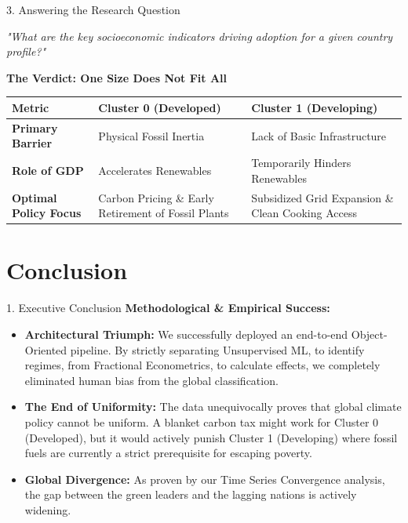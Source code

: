 \documentclass[aspectratio=169]{beamer}
\begin{document}
\begin{frame}{3. Answering the Research Question}
  \begin{center}
      \Large \textit{"What are the key socioeconomic indicators driving adoption for a given country profile?"}
  \end{center}
  \vspace{0.6cm}
  
  \textbf{The Verdict: One Size Does Not Fit All}
  \begin{table}[]
      \centering
      \small
      \begin{tabular}{p{4cm} p{5cm} p{5cm}}
      \toprule
      \textbf{Metric} & \textbf{Cluster 0 (Developed)} & \textbf{Cluster 1 (Developing)} \\
      \midrule
      \textbf{Primary Barrier} & Physical Fossil Inertia & Lack of Basic Infrastructure \\
      \textbf{Role of GDP} & Accelerates Renewables & Temporarily Hinders Renewables \\
      \textbf{Optimal Policy Focus} & Carbon Pricing \& Early Retirement of Fossil Plants & Subsidized Grid Expansion \& Clean Cooking Access \\
      \bottomrule
      \end{tabular}
  \end{table}
\end{frame}

\section{Conclusion}

\begin{frame}{1. Executive Conclusion}
  \textbf{Methodological \& Empirical Success:}
  \vspace{0.2cm}
  
  \begin{itemize}
      \item \textbf{Architectural Triumph:} We successfully deployed an end-to-end Object-Oriented pipeline. By strictly separating Unsupervised ML, to identify regimes, from Fractional Econometrics, to calculate effects, we completely eliminated human bias from the global classification.
      \item \textbf{The End of Uniformity:} The data unequivocally proves that global climate policy cannot be uniform. A blanket carbon tax might work for Cluster 0 (Developed), but it would actively punish Cluster 1 (Developing) where fossil fuels are currently a strict prerequisite for escaping poverty.
      \item \textbf{Global Divergence:} As proven by our Time Series Convergence analysis, the gap between the green leaders and the lagging nations is actively widening. 
  \end{itemize}
\end{frame}
\end{document}
